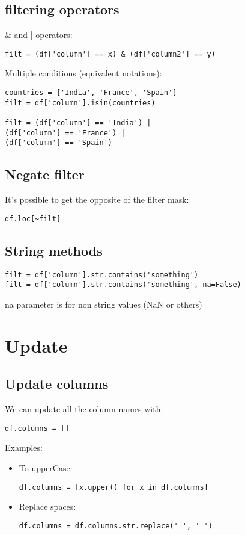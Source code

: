 \documentclass[french]{article}
\begin{document}
\subsection{filtering operators}

\& and | operators:
\begin{verbatim}
filt = (df['column'] == x) & (df['column2'] == y)
\end{verbatim}

Multiple conditions (equivalent notations):
\begin{verbatim}
countries = ['India', 'France', 'Spain']
filt = df['column'].isin(countries)

filt = (df['column'] == 'India') |
(df['column'] == 'France') |
(df['column'] == 'Spain')
\end{verbatim}

\subsection{Negate filter}
It's possible to get the opposite of the filter mask:
\begin{verbatim}
df.loc[~filt]
\end{verbatim}

\subsection{String methods}

\begin{verbatim}
filt = df['column'].str.contains('something')
filt = df['column'].str.contains('something', na=False)
\end{verbatim}
na parameter is for non string values (NaN or others)

\section{Update}

\subsection{Update columns}
We can update all the column names with:
\begin{verbatim}
df.columns = []
\end{verbatim}

Examples:
\begin{itemize}
\item To upperCase:
\begin{verbatim}
df.columns = [x.upper() for x in df.columns]
\end{verbatim}

\item Replace spaces:
\begin{verbatim}
df.columns = df.columns.str.replace(' ', '_')
\end{verbatim}
\end{itemize}
\end{document}

